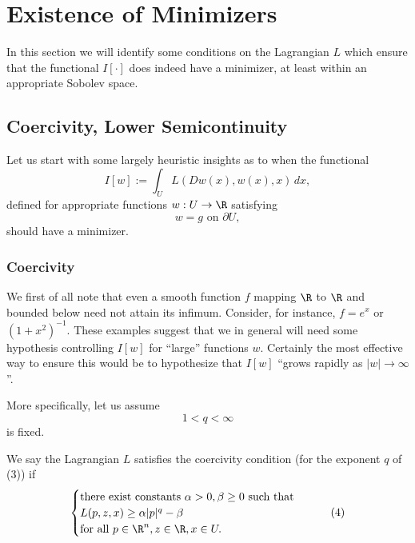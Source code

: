 \section{Existence of Minimizers}
\label{sec:existence-of-minimizers}

In this section we will identify some conditions on the Lagrangian $L$ which ensure that the functional $I[\cdot]$ does indeed have a minimizer, at least within an appropriate Sobolev space.

\subsection{Coercivity, Lower Semicontinuity}
\label{sec:coercivity-lower-semicontinuity}

Let us start with some largely heuristic insights as to when the functional
\[
I[w] := \int_U L(Dw(x), w(x), x) \, dx,
\tag{1}
\]
defined for appropriate functions $w : U \to \R$ satisfying
\[
w = g \text{ on } \partial U,
\tag{2}
\]
should have a minimizer.

\subsubsection{Coercivity}

We first of all note that even a smooth function $f$ mapping $\R$ to $\R$ and bounded below need not attain its infimum. Consider, for instance, $f = e^x$ or $(1 + x^2)^{-1}$. These examples suggest that we in general will need some hypothesis controlling $I[w]$ for ``large'' functions $w$. Certainly the most effective way to ensure this would be to hypothesize that $I[w]$ ``grows rapidly as $|w| \to \infty$''.

More specifically, let us assume
\[
1 < q < \infty
\tag{3}
\]
is fixed.

\begin{definition}
\label{def:coercivity-condition-lagrangian}
We say the Lagrangian $L$ satisfies the coercivity condition (for the exponent $q$ of (3)) if
\[
\begin{cases}
\text{there exist constants } \alpha > 0, \beta \geq 0 \text{ such that} \\
L(p, z, x) \geq \alpha|p|^q - \beta \\
\text{for all } p \in \R^n, z \in \R, x \in U.
\end{cases}
\tag{4}
\]
\end{definition}

